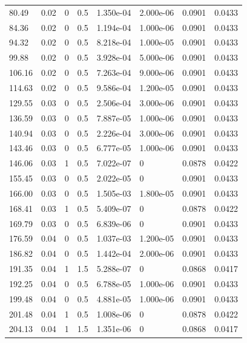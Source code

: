 \documentclass[preview]{standalone}
\begin{document}
{{\begin{tabular}{L{1.2cm}C{1.2cm} C{0.3cm}C{0.5cm} C{1.4cm}C{1.4cm} C{1.4cm}C{1.4cm}}
  80.49  &  0.02  & 0     & 0.5 &  1.350e-04  & 2.000e-06  & 0.0901 &  0.0433   \\ 
  84.36  &  0.02  & 0     & 0.5 &  1.194e-04  & 1.000e-06  & 0.0901 &  0.0433   \\ 
  94.32  &  0.02  & 0     & 0.5 &  8.218e-04  & 1.000e-05  & 0.0901 &  0.0433   \\ 
  99.88  &  0.02  & 0     & 0.5 &  3.928e-04  & 5.000e-06  & 0.0901 &  0.0433   \\ 
  106.16  &  0.02  & 0     & 0.5 &  7.263e-04  & 9.000e-06  & 0.0901 &  0.0433   \\ 
  114.63  &  0.02  & 0     & 0.5 &  9.586e-04  & 1.200e-05  & 0.0901 &  0.0433   \\ 
  129.55  &  0.03  & 0     & 0.5 &  2.506e-04  & 3.000e-06  & 0.0901 &  0.0433   \\ 
  136.59  &  0.03  & 0     & 0.5 &  7.887e-05  & 1.000e-06  & 0.0901 &  0.0433   \\ 
  140.94  &  0.03  & 0     & 0.5 &  2.226e-04  & 3.000e-06  & 0.0901 &  0.0433   \\ 
  143.46  &  0.03  & 0     & 0.5 &  6.777e-05  & 1.000e-06  & 0.0901 &  0.0433   \\ 
  146.06  &  0.03  & 1     & 0.5 &  7.022e-07  & 0  & 0.0878 &  0.0422   \\ 
  155.45  &  0.03  & 0     & 0.5 &  2.022e-05  & 0  & 0.0901 &  0.0433   \\ 
  166.00  &  0.03  & 0     & 0.5 &  1.505e-03  & 1.800e-05  & 0.0901 &  0.0433   \\ 
  168.41  &  0.03  & 1     & 0.5 &  5.409e-07  & 0  & 0.0878 &  0.0422   \\ 
  169.79  &  0.03  & 0     & 0.5 &  6.839e-06  & 0  & 0.0901 &  0.0433   \\ 
  176.59  &  0.04  & 0     & 0.5 &  1.037e-03  & 1.200e-05  & 0.0901 &  0.0433   \\ 
  186.82  &  0.04  & 0     & 0.5 &  1.442e-04  & 2.000e-06  & 0.0901 &  0.0433   \\ 
  191.35  &  0.04  & 1     & 1.5 &  5.288e-07  & 0  & 0.0868 &  0.0417   \\ 
  192.25  &  0.04  & 0     & 0.5 &  6.788e-05  & 1.000e-06  & 0.0901 &  0.0433   \\ 
  199.48  &  0.04  & 0     & 0.5 &  4.881e-05  & 1.000e-06  & 0.0901 &  0.0433   \\ 
  201.48  &  0.04  & 1     & 0.5 &  1.008e-06  & 0  & 0.0878 &  0.0422   \\ 
  204.13  &  0.04  & 1     & 1.5 &  1.351e-06  & 0  & 0.0868 &  0.0417   \\ 

\end{tabular}}}
\end{document}
